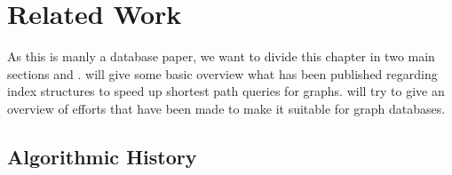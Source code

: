 \chapter{Related Work} 

As this is manly a database paper, we want to divide this chapter in two main sections  and .  
will give some basic overview what has been published regarding index structures to speed up shortest path queries for graphs.  will try 
to give an overview of efforts that have been made to make \cite[Customizable Contraction Hierarchies]{CCH} it suitable for graph databases.

\section[Algorithmic History]{Algorithmic History} \label{sec:algorithmic_history}

